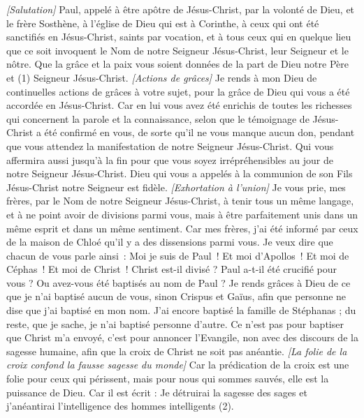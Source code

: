 \BFont
\begin{multicols}{2}
\textit{[Salutation]}
\VerseOne{}Paul, appelé à être apôtre de Jésus-Christ, par la volonté de Dieu, et le frère Sosthène,
à l'église de Dieu qui est à Corinthe, à ceux qui ont été sanctifiés en Jésus-Christ, saints par vocation, et à tous ceux qui en quelque lieu que ce soit invoquent le Nom de notre Seigneur Jésus-Christ, leur Seigneur et le nôtre.
Que la grâce et la paix vous soient données de la part de Dieu notre Père et (1) Seigneur Jésus-Christ.
\textit{[Actions de grâces]}
Je rends à mon Dieu de continuelles actions de grâces à votre sujet, pour la grâce de Dieu qui vous a été accordée en Jésus-Christ.
Car en lui vous avez été enrichis de toutes les richesses qui concernent la parole et la connaissance,
selon que le témoignage de Jésus-Christ a été confirmé en vous,
de sorte qu'il ne vous manque aucun don, pendant que vous attendez la manifestation de notre Seigneur Jésus-Christ.
Qui vous affermira aussi jusqu’à la fin pour que vous soyez irrépréhensibles au jour de notre Seigneur Jésus-Christ.
Dieu qui vous a appelés à la communion de son Fils Jésus-Christ notre Seigneur est fidèle.
\textit{[Exhortation à l'union]}
Je vous prie, mes frères, par le Nom de notre Seigneur Jésus-Christ, à tenir tous un même langage, et à ne point avoir de divisions parmi vous, mais à être parfaitement unis dans un même esprit et dans un même sentiment.
Car mes frères, j’ai été informé par ceux de la maison de Chloé qu'il y a des dissensions parmi vous.
Je veux dire que chacun de vous parle ainsi : Moi je suis de Paul ! Et moi d'Apollos ! Et moi de Céphas ! Et moi de Christ !
Christ est-il divisé ? Paul a-t-il été crucifié pour vous ? Ou avez-vous été baptisés au nom de Paul ?
Je rends grâces à Dieu de ce que je n'ai baptisé aucun de vous, sinon Crispus et Gaïus,
afin que personne ne dise que j'ai baptisé en mon nom.
J'ai encore baptisé la famille de Stéphanas ; du reste, que je sache, je n’ai baptisé personne d’autre.
Ce n’est pas pour baptiser que Christ m'a envoyé, c’est pour annoncer l’Evangile, non avec des discours de la sagesse humaine, afin que la croix de Christ ne soit pas anéantie.
\textit{[La folie de la croix confond la fausse sagesse du monde]}
Car la prédication de la croix est une folie pour ceux qui périssent, mais pour nous qui sommes sauvés, elle est la puissance de Dieu.
Car il est écrit : Je détruirai la sagesse des sages et j'anéantirai l'intelligence des hommes intelligents (2).

\end{multicols}
